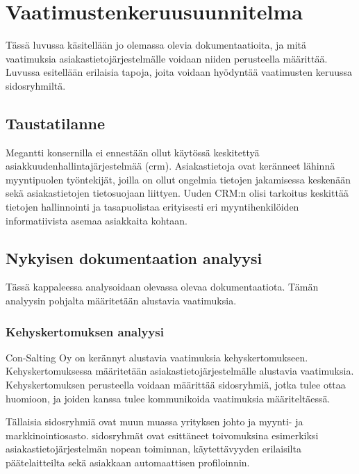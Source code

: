 \chapter{Vaatimustenkeruusuunnitelma} %
\label{keruu} %
\thispagestyle{fancy} %

Tässä luvussa käsitellään jo olemassa olevia dokumentaatioita, ja mitä vaatimuksia asiakastietojärjestelmälle voidaan niiden perusteella määrittää. Luvussa esitellään erilaisia tapoja, joita voidaan hyödyntää vaatimusten keruussa sidosryhmiltä.

\section{Taustatilanne}

Megantti konsernilla ei ennestään ollut käytössä keskitettyä asiakkuudenhallintajärjestelmää (\acrshort{crm}).
Asiakastietoja ovat keränneet lähinnä myyntipuolen työntekijät, joilla on ollut ongelmia tietojen jakamisessa keskenään sekä asiakastietojen tietosuojaan liittyen. Uuden CRM:n olisi tarkoitus keskittää tietojen hallinnointi ja tasapuolistaa erityisesti eri myyntihenkilöiden informatiivista asemaa asiakkaita kohtaan.

\section{Nykyisen dokumentaation analyysi}
Tässä kappaleessa analysoidaan olevassa olevaa dokumentaatiota. Tämän analyysin pohjalta määritetään alustavia vaatimuksia.


    \subsection{Kehyskertomuksen analyysi}
    Con-Salting Oy on kerännyt alustavia vaatimuksia kehyskertomukseen. Kehyskertomuksessa määritetään asiakastietojärjestelmälle alustavia vaatimuksia. Kehyskertomuksen perusteella voidaan määrittää sidosryhmiä, jotka tulee ottaa huomioon, ja joiden kanssa tulee kommunikoida vaatimuksia määriteltäessä.

    Tällaisia sidosryhmiä ovat muun muassa yrityksen johto ja myynti- ja markkinointiosasto.
    sidosryhmät ovat esittäneet toivomuksina esimerkiksi asiakastietojärjestelmän nopean toiminnan, käytettävyyden erilaisilta päätelaitteilta sekä asiakkaan 
    automaattisen profiloinnin. 
        
